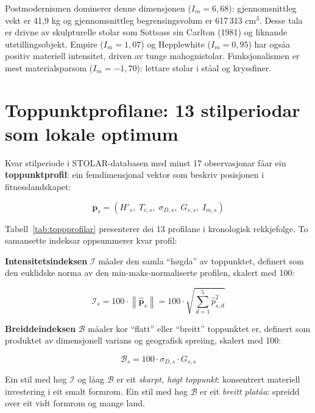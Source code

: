 \documentclass[10pt, a4paper, twocolumn]{article}
\begin{document}
Postmodernismen dominerer denne dimensjonen ($I_m = 6{,}68$): gjennomsnittleg vekt er 41{,}9 kg og gjennomsnittleg begrensingsvolum er 617\,313 cm$^3$. Desse tala er drivne av skulpturelle stolar som Sottsass sin Carlton (1981) og liknande utstillingsobjekt. Empire ($I_m = 1{,}07$) og Hepplewhite ($I_m = 0{,}95$) har ogs\r{a}a positiv materiell intensitet, driven av tunge mahognistolar. Funksjonalismen er mest materialsparsom ($I_m = -1{,}70$): lettare stolar i st\r{a}al og kryssfiner.


\section{Toppunktprofilane: 13 stilperiodar som lokale optimum}

Kvar stilperiode i STOLAR-databasen med minst 17 observasjonar f\r{a}ar ein \textbf{toppunktprofil}: ein femdimensjonal vektor som beskriv posisjonen i fitnesslandskapet:

\begin{equation}
  \mathbf{p}_s = (H'_s,\; T_{c,s},\; \sigma_{D,s},\; G_{s,s},\; I_{m,s})
\end{equation}

Tabell~\ref{tab:toppprofilar} presenterer dei 13 profilane i kronologisk rekkjefolge. To samansette indeksar oppsummerer kvar profil:

\textbf{Intensitetsindeksen} $\mathcal{I}$ m\r{a}aler den samla ``h\o gda'' av toppunktet, definert som den euklidske norma av den min-maks-normaliserte profilen, skalert med 100:

\begin{equation}
  \mathcal{I}_s = 100 \cdot \left\|\hat{\mathbf{p}}_s\right\| = 100 \cdot \sqrt{\sum_{d=1}^{5} \hat{p}_{s,d}^2}
\end{equation}

\textbf{Breiddeindeksen} $\mathcal{B}$ m\r{a}aler kor ``flatt'' eller ``breitt'' toppunktet er, definert som produktet av dimensjonell varians og geografisk spreiing, skalert med 100:

\begin{equation}
  \mathcal{B}_s = 100 \cdot \sigma_{D,s} \cdot G_{s,s}
\end{equation}

Ein stil med h\o g $\mathcal{I}$ og l\r{a}ag $\mathcal{B}$ er eit \emph{skarpt, h\o gt toppunkt}: konsentrert materiell investering i eit smalt formrom. Ein stil med h\o g $\mathcal{B}$ er eit \emph{breitt plat\r{a}a}: spreidd over eit vidt formrom og mange land.
\end{document}
